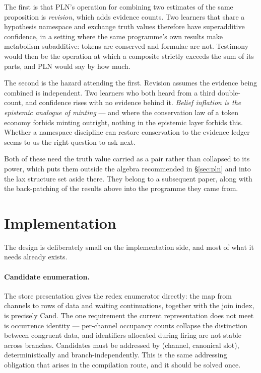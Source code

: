\documentclass[11pt,a4paper]{article}
\theoremstyle{plain}
\theoremstyle{definition}
\theoremstyle{remark}
\newcommand{\Cand}{\mathrm{Cand}}
\begin{document}
The first is that PLN's operation for combining two estimates of the same
proposition is \emph{revision}, which adds evidence counts. Two learners that
share a hypothesis namespace and exchange truth values therefore have
superadditive confidence, in a setting where the same programme's own results
make metabolism subadditive: tokens are conserved and formulae are not. Testimony
would then be the operation at which a composite strictly exceeds the sum of its
parts, and PLN would say by how much.

The second is the hazard attending the first. Revision assumes the evidence being
combined is independent. Two learners who both heard from a third double-count,
and confidence rises with no evidence behind it. \emph{Belief inflation is the
epistemic analogue of minting} --- and where the conservation law of a token
economy forbids minting outright, nothing in the epistemic layer forbids this.
Whether a namespace discipline can restore conservation to the evidence ledger
seems to us the right question to ask next.

Both of these need the truth value carried as a pair rather than collapsed to its
power, which puts them outside the algebra recommended in \S\ref{sec:pln} and
into the lax structure set aside there. They belong to a subsequent paper, along
with the back-patching of the results above into the programme they came from.

\section{Implementation}\label{sec:impl}

The design is deliberately small on the implementation side, and most of what it
needs already exists.

\paragraph{Candidate enumeration.} The store presentation gives the redex
enumerator directly: the map from channels to rows of data and waiting
continuations, together with the join index, is precisely $\Cand$. The one
requirement the current representation does not meet is occurrence identity ---
per-channel occupancy counts collapse the distinction between congruent data, and
identifiers allocated during firing are not stable across branches. Candidates
must be addressed by (channel, canonical slot), deterministically and
branch-independently. This is the same addressing obligation that arises in the
compilation route, and it should be solved once.
\end{document}

